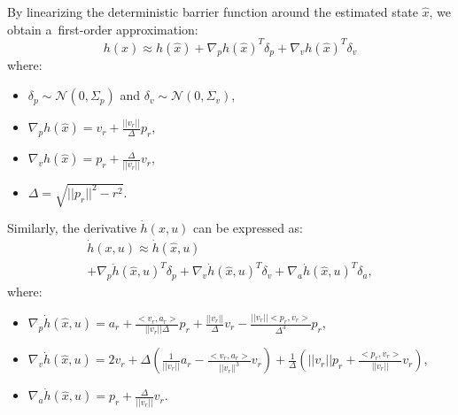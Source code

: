 \documentclass{svproc}
\begin{document}
By linearizing the deterministic barrier function around the estimated state
$\hat{x}$, we obtain a~first-order approximation:
\begin{equation}
    \label{eq:probabilistic_approximation}
    h(x) \approx h(\hat{x}) + \nabla_{p} h(\hat{x})^{T}\delta_{p}
    + \nabla_{v} h(\hat{x})^{T}\delta_{v}
\end{equation}
where:
\begin{itemize}
    \item $\delta_{p} \sim \mathcal{N}(0,\Sigma_{p})$ and $\delta_{v} \sim \mathcal{N}(0,\Sigma_{v})$,
    \item $\nabla_{p}h(\hat{x}) = v_{r} + \frac{||v_{r}||}{\Delta}p_{r}$,
    \item $\nabla_{v}h(\hat{x}) = p_{r} + \frac{\Delta}{||v_{r}||}v_{r}$,
    \item $\Delta = \sqrt{||p_{r}||^{2} - r^{2}}$.
\end{itemize}

Similarly, the derivative $\dot{h}(x,u)$ can be expressed as:
\[
    \begin{array}{c}
        \dot{h}(x,u) \approx \dot{h}(\hat{x},u) \\
         + \nabla_{p} \dot{h}(\hat{x},u)^{T}\delta_{p} + \nabla_{v} \dot{h}(\hat{x},u)^{T}\delta_{v} + \nabla_{a} \dot{h}(\hat{x},u)^{T}\delta_{a},
    \end{array}
\]
where:
\begin{itemize}
    \item $\nabla_{p} \dot{h}(\hat{x},u) = a_{r} +
    \frac{<v_{r},a_{r}>}{||v_{r}||\Delta}p_{r} +
    \frac{||v_{r}||}{\Delta}v_{r} -
    \frac{||v_{r}||<p_{r},v_{r}>}{\Delta^{3}}p_{r}$,
    \item $\nabla_{v} \dot{h}(\hat{x},u) = 2v_{r} +
    \Delta\left(\frac{1}{||v_{r}||}a_{r} -
    \frac{<v_{r},a_{r}>}{||v_{r}||^{3}}v_{r} \right) + \frac{1}{\Delta} \left(
    ||v_{r}||p_{r} + \frac{<p_{r}, v_{r}>}{||v_{r}||}v_{r} \right)$,
    \item $\nabla_{a} \dot{h}(\hat{x},u) = p_{r} + \frac{\Delta}{||v_{r}||}v_{r}$.
\end{itemize}
\end{document}
